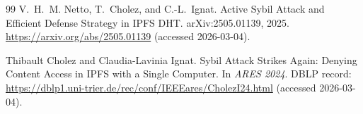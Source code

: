 \documentclass[11pt]{article}
\begin{document}
\begin{thebibliography}{99}
V.~H.~M. Netto, T.~Cholez, and C.-L.~Ignat.
\newblock Active Sybil Attack and Efficient Defense Strategy in IPFS DHT.
\newblock arXiv:2505.01139, 2025. \url{https://arxiv.org/abs/2505.01139} (accessed 2026-03-04).

Thibault Cholez and Claudia-Lavinia Ignat.
\newblock Sybil Attack Strikes Again: Denying Content Access in IPFS with a Single Computer.
\newblock In \emph{ARES 2024}. DBLP record: \url{https://dblp1.uni-trier.de/rec/conf/IEEEares/CholezI24.html} (accessed 2026-03-04).

\end{thebibliography}
\end{document}

